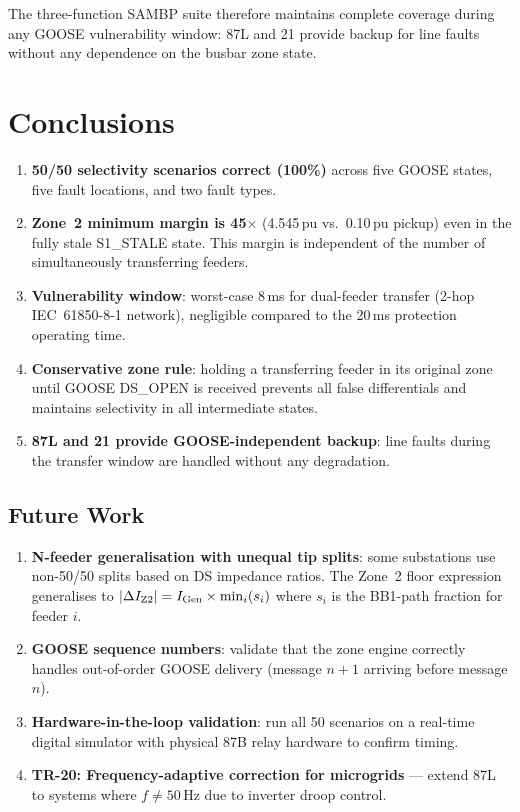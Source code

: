 \documentclass[11pt, a4paper]{article}
\begin{document}
The three-function SAMBP suite therefore maintains complete coverage during
any GOOSE vulnerability window: 87L and 21 provide backup for line faults
without any dependence on the busbar zone state.


\section{Conclusions}
\label{sec:conclusions}

\begin{enumerate}
  \item \textbf{50/50 selectivity scenarios correct (100\%)} across five
        GOOSE states, five fault locations, and two fault types.
  \item \textbf{Zone~2 minimum margin is 45$\times$} (4.545\,pu vs.\
        0.10\,pu pickup) even in the fully stale S1\_STALE state.
        This margin is independent of the number of simultaneously
        transferring feeders.
  \item \textbf{Vulnerability window}: worst-case 8\,ms for dual-feeder
        transfer (2-hop IEC~61850-8-1 network), negligible compared to
        the 20\,ms protection operating time.
  \item \textbf{Conservative zone rule}: holding a transferring feeder in its
        original zone until GOOSE DS\_OPEN is received prevents all
        false differentials and maintains selectivity in all intermediate states.
  \item \textbf{87L and 21 provide GOOSE-independent backup}: line faults
        during the transfer window are handled without any degradation.
\end{enumerate}

\subsection{Future Work}

\begin{enumerate}
  \item \textbf{N-feeder generalisation with unequal tip splits}: some
        substations use non-50/50 splits based on DS impedance ratios.
        The Zone~2 floor expression generalises to
        $|\Delta I_{\rm Z2}| = I_{\rm Gen} \times \min_i(s_i)$ where $s_i$
        is the BB1-path fraction for feeder $i$.
  \item \textbf{GOOSE sequence numbers}: validate that the zone engine
        correctly handles out-of-order GOOSE delivery (message $n+1$
        arriving before message $n$).
  \item \textbf{Hardware-in-the-loop validation}: run all 50 scenarios on a
        real-time digital simulator with physical 87B relay hardware to
        confirm timing.
  \item \textbf{TR-20: Frequency-adaptive correction for microgrids} ---
        extend 87L to systems where $f \neq 50$\,Hz due to inverter droop
        control.
\end{enumerate}




\end{document}
